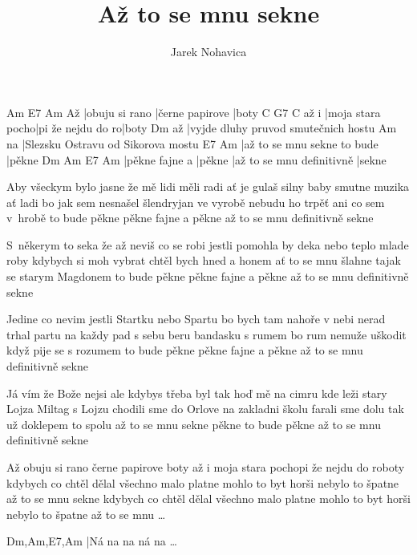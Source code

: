 \documentclass{song}
\title{Až to se mnu sekne}
\author{Jarek Nohavica}
\begin{document}
\strophe
   Am             E7              Am
Až |obuju si rano |černe papirove |boty
     C                G7                C
až i |moja stara pocho|pi že nejdu do ro|boty
   Dm
až |vyjde dluhy pruvod smutečnich hostu
   Am
na |Slezsku Ostravu od Sikorova mostu
E7                         Am
|až to se mnu sekne to bude |pěkne
Dm             Am     E7                        Am
|pěkne fajne a |pěkne |až to se mnu definitivně |sekne
\endstrophe

\strophe*
Aby všeckym bylo jasne že mě lidi měli radi
ať je gulaš silny baby smutne muzika ať ladi
bo jak sem nesnašel šlendryjan ve vyrobě
nebudu ho trpěť ani co sem v~hrobě to bude pěkne
pěkne fajne a pěkne až to se mnu definitivně sekne
\endstrophe

\strophe*
S~někerym to seka že až neviš co se robi
jestli pomohla by deka nebo teplo mlade roby
kdybych si moh vybrat chtěl bych hned a honem
ať to se mnu šlahne tajak se starym Magdonem to bude pěkne
pěkne fajne a pěkne až to se mnu definitivně sekne
\endstrophe

\strophe*
Jedine co nevim jestli Startku nebo Spartu
bo bych tam nahoře v nebi nerad trhal partu
na každy pad s sebu beru bandasku s rumem
bo rum nemuže uškodit když pije se s rozumem to bude pěkne
pěkne fajne a pěkne až to se mnu definitivně sekne
\endstrophe

\strophe*
Já vím že Bože nejsi ale kdybys třeba byl tak
hoď mě na cimru kde leži stary Lojza Miltag
s Lojzu chodili sme do Orlove na zakladni školu
farali sme dolu tak už doklepem to spolu až to se mnu sekne
pěkne to bude pěkne až to se mnu definitivně sekne
\endstrophe

\strophe*
Až obuju si rano černe papirove boty
až i moja stara pochopi že nejdu do roboty
kdybych co chtěl dělal všechno malo platne
mohlo to byt horši nebylo to špatne až to se mnu sekne
kdybych co chtěl dělal všechno malo platne
mohlo to byt horši nebylo to špatne až to se mnu \ldots
\endstrophe

\strophe
Dm,Am,E7,Am
|Ná na na ná na \ldots
\endstrophe
\end{document}
